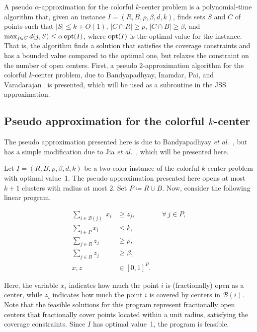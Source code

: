 A pseudo $\alpha$-approximation for the colorful $k$-center problem is a polynomial-time algorithm that, given an instance $I = (R,B,\rho,\beta,d,k)$, finds sets $S$ and $C$ of points such that $|S| \leq k + O(1)$, $|C \cap R| \geq \rho$, $|C\cap B| \geq \beta$, and $\max_{j\in C}d(j,S) \leq \alpha \,\mathrm{opt}(I)$, where $\mathrm{opt}(I)$ is the optimal value for the instance. That is, the algorithm finds a solution that satisfies the coverage constraints and has a bounded value compared to the optimal one, but relaxes the constraint on the number of open centers. First, a pseudo 2-approximation algorithm for the colorful \(k\)-center problem, due to Bandyapadhyay, Inamdar, Pai, and Varadarajan~\cite{BIPV2019} is presented, which will be used as a subroutine in the JSS approximation.

\subsection{Pseudo approximation for the colorful $k$-center}

The pseudo approximation presented here is due to Bandyapadhyay \emph{et al.}~\cite{BIPV2019}, but has a simple modification due to Jia \emph{et al.}~\cite{JSS2020}, which will be presented here.

Let \(I = (R,B,\rho,\beta,d,k)\) be a two-color instance of the colorful $k$-center problem with optimal value~1. 
The pseudo approximation presented here opens at most $k+1$ clusters with radius at most 2.
Set $P \coloneqq R \cup B$.
Now, consider the following linear program.

\begin{equation}\tag{LP1} \label{LP1}
\begin{aligned}
\sum_{i\in \mathcal{B}(j)} \; x_i &\ge z_j,
  &&\forall\,j\in P,\\
\sum_{i\in P} x_i &\le k,\\
\sum_{j\in R} z_j &\ge \rho,\\
\sum_{j\in B} z_j &\ge \beta,\\
x,z &\in[0,1]^P.
\end{aligned}
\end{equation}

Here, the variable $x_i$ indicates how much the point $i$ is (fractionally) open as a center, while $z_i$ indicates how much the point $i$ is covered by centers in $\mathcal{B}(i)$. 
Note that the feasible solutions for this program represent fractionally open centers that fractionally cover points located within a unit radius, satisfying the coverage constraints. 
Since $I$ has optimal value~1, the program is feasible.

